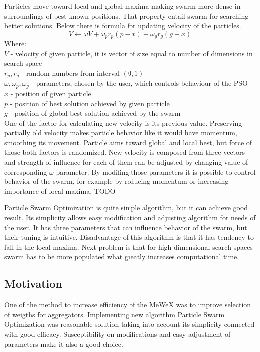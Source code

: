Particles move toward local and global maxima making swarm more dense in surroundings of best known positions. 
That property entail swarm for searching better solutions.
Below there is formula for updating velocity of the particles.
\[ 
    V \gets \omega V + \omega _{p} r _{p} (p - x) + \omega _{g} r _{g} (g - x)
\]
Where: \\
\(V\)  - velocity of given particle, it is vector of size equal to number of dimensions in search space \\
\(r _{p}, r _{g}\) - random numbers from interval \((0,1)\) \\
\(\omega, \omega _{p}, \omega _{g}\) - parameters, chosen by the user, which controls behaviour of the PSO \\
\(x\)  - position of given particle \\
\(p\)  - position of best solution achieved by given particle \\
\(g\)  - position of global best solution achieved by the swarm \\

One of the factor for calculating new velocity is its previous value. Preserving partially old velocity makes particle behavior 
like it would have momentum, smoothing its movement. Particle aims toward global and local best, but force of those both factors is randomized.
New velocity is composed from three vectors and strength of influence for each of them can be adjusted by changing value 
of corresponding \(\omega\) parameter. By modifing those parameters it is possible to control behavior of the swarm, for example 
by reducing momentum or increasing importance of local maxima. TODO

Particle Swarm Optimization is quite simple algorithm, but it can achieve good result. Its simplicity allows easy modification and adjusting 
algorithm for needs of the user. It has three parameters that can influence behavior of the swarm, but their tuning is intuitive. 
Disadvantage of this algorithm is that it has tendency to fall in the local maxima. Next problem is that for high dimensional search spaces 
swarm has to be more populated what greatly increases computational time. 

\subsection{Motivation}
One of the method to increase efficiency of the MeWeX was to improve selection of weigths for aggregators. 
Implementing new algorithm Particle Swarm Optimization was reasonable solution taking into account its simplicity 
connected with good efficacy. Susceptibility on modifications and easy adjustment of parameters make it also a good choice.

